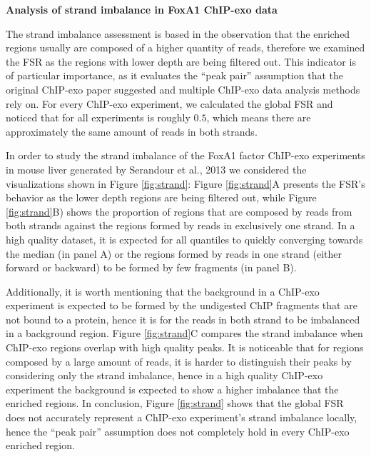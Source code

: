\documentclass{bmcart}\usepackage[]{graphicx}\usepackage[]{color}
\begin{document}

\textbf{Analysis of strand imbalance in FoxA1 ChIP-exo data}


The strand imbalance assessment is based in the observation that the
enriched regions usually are composed of a higher quantity of reads,
therefore we examined the FSR as the regions with lower depth are
being filtered out. This indicator is of particular importance, as it
evaluates the ``peak pair'' assumption that the original ChIP-exo
paper suggested and multiple ChIP-exo data analysis methods rely
on. For every ChIP-exo experiment, we calculated the global FSR and
noticed that for all experiments is roughly $0.5$, which means there
are approximately the same amount of reads in both strands.

In order to study the strand imbalance of the FoxA1 factor ChIP-exo
experiments in mouse liver generated by Serandour et al.,
2013\nocite{exoillumina} we considered the visualizations shown in
Figure \ref{fig:strand}: Figure \ref{fig:strand}A presents the FSR's
behavior as the lower depth regions are being filtered out, while
Figure \ref{fig:strand}B) shows the proportion of regions that are
composed by reads from both strands against the regions formed by
reads in exclusively one strand. In a high quality dataset, it is
expected for all quantiles to quickly converging towards the median
(in panel A) or the regions formed by reads in one strand (either
forward or backward) to be formed by few fragments (in panel
B). 

Additionally, it is worth mentioning that the background in a ChIP-exo
experiment is expected to be formed by the undigested ChIP fragments
that are not bound to a protein, hence it is for the reads in both
strand to be imbalanced in a background region. Figure
\ref{fig:strand}C compares the strand imbalance when ChIP-exo regions
overlap with high quality peaks. It is noticeable that for regions
composed by a large amount of reads, it is harder to distinguish their
peaks by considering only the strand imbalance, hence in a high
quality ChIP-exo experiment the background is expected to show a
higher imbalance that the enriched regions. In conclusion, Figure
\ref{fig:strand} shows that the global FSR does not accurately
represent a ChIP-exo experiment's strand imbalance locally, hence the
``peak pair'' assumption does not completely hold in every ChIP-exo
enriched region.
\end{document}
